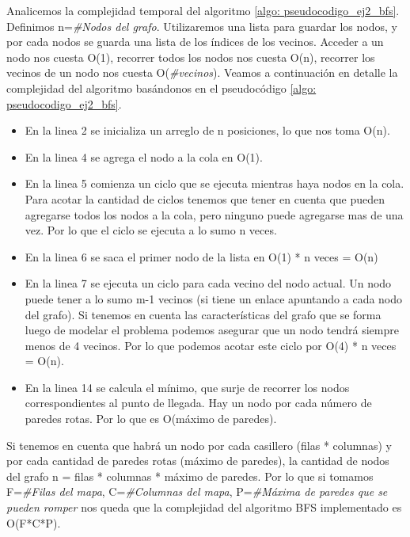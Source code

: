 \medskip

\par Analicemos la complejidad temporal del algoritmo \ref{algo: pseudocodigo_ej2_bfs}. Definimos n=\textit{\#Nodos del grafo}. Utilizaremos una lista para guardar los nodos, y por cada nodos se guarda una lista de los índices de los vecinos. Acceder a un nodo nos cuesta O(1), recorrer todos los nodos nos cuesta O(n), recorrer los vecinos de un nodo nos cuesta O(\textit{\#vecinos}). Veamos a continuación en detalle la complejidad del algoritmo basándonos en el pseudocódigo \ref{algo: pseudocodigo_ej2_bfs}.

\begin{itemize}
	\item En la linea 2 se inicializa un arreglo de n posiciones, lo que nos toma O(n).
	\item En la linea 4 se agrega el nodo a la cola en O(1).
	\item En la linea 5 comienza un ciclo que se ejecuta mientras haya nodos en la cola. Para acotar la cantidad de ciclos tenemos que tener en cuenta que pueden agregarse todos los nodos a la cola, pero ninguno puede agregarse mas de una vez. Por lo que el ciclo se ejecuta a lo sumo n veces.
	\item En la linea 6 se saca el primer nodo de la lista en O(1) * n veces = O(n)
	\item En la linea 7 se ejecuta un ciclo para cada vecino del nodo actual. Un nodo puede tener a lo sumo m-1 vecinos (si tiene un enlace apuntando a cada nodo del grafo). Si tenemos en cuenta las características del grafo que se forma luego de modelar el problema podemos asegurar que un nodo tendrá siempre menos de 4 vecinos. Por lo que podemos acotar este ciclo por O(4) * n veces = O(n).
	\item En la linea 14 se calcula el mínimo, que surje de recorrer los nodos correspondientes al punto de llegada. Hay un nodo por cada número de paredes rotas. Por lo que es O(máximo de paredes).
\end{itemize}

\par Si tenemos en cuenta que habrá un nodo por cada casillero (filas * columnas) y por cada cantidad de paredes rotas (máximo de paredes), la cantidad de nodos del grafo n = filas * columnas * máximo de paredes. Por lo que si tomamos F=\textit{\#Filas del mapa}, C=\textit{\#Columnas del mapa}, P=\textit{\#Máxima de paredes que se pueden romper} nos queda que la complejidad del algoritmo BFS implementado es O(F*C*P).

